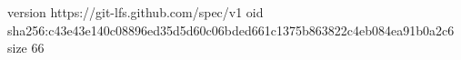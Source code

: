 version https://git-lfs.github.com/spec/v1
oid sha256:c43e43e140c08896ed35d5d60c06bded661c1375b863822c4eb084ea91b0a2c6
size 66
